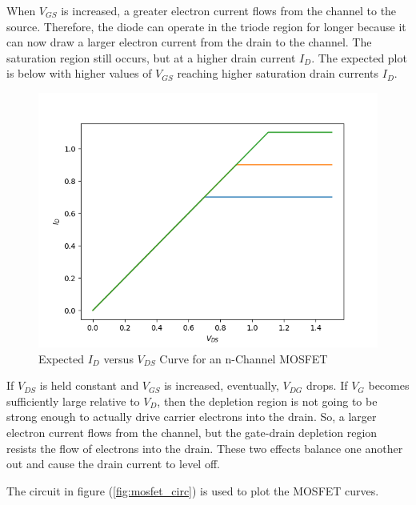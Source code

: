 When $V_{GS}$ is increased, a greater electron current flows from the channel to the source. Therefore, the diode can operate in the triode region for longer because it can now draw a larger electron current from the drain to the channel. The saturation region still occurs, but at a higher drain current $I_D$. The expected plot is below with higher values of $V_{GS}$ reaching higher saturation drain currents $I_D$.


\FloatBarrier

\begin{figure}[h!]
	\centering
	\includegraphics[scale=0.75]{./images/id_vs_vds.PNG}
	\caption{Expected $I_D$ versus $V_{DS}$ Curve for an n-Channel MOSFET}
	\label{fig:id_vs_vds}
\end{figure}

\FloatBarrier

If $V_{DS}$ is held constant and $V_{GS}$ is increased, eventually, $V_{DG}$ drops. If $V_{G}$ becomes sufficiently large relative to $V_{D}$, then the depletion region is not going to be strong enough to actually drive carrier electrons into the drain. So, a larger electron current flows from the channel, but the gate-drain depletion region resists the flow of electrons into the drain. These two effects balance one another out and cause the drain current to level off.

The circuit in figure (\ref{fig:mosfet_circ}) is used to plot the MOSFET curves.

